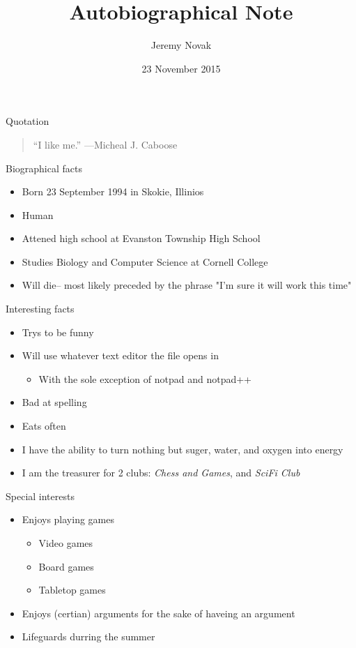 \documentclass{beamer}
\title{Autobiographical Note}
\author{Jeremy Novak}
\institute{Cornell College}
\date{23 November 2015}
\begin{document}
\begin{frame}
  \titlepage
\end{frame}

\begin{frame}{Quotation}
\begin{quotation}
\noindent
``I like me.''
  \flushright
  ---Micheal J. Caboose
  \end{quotation}
\end{frame}

\begin{frame}{Biographical facts}
\begin{itemize}
  \item Born 23 September 1994 in Skokie, Illinios
  \item Human
  \item Attened high school at Evanston Township High School  
  \item Studies Biology and Computer Science at Cornell College
  \item Will die-- most likely preceded by the phrase "I'm sure it will work this time"
  \end{itemize}
\end{frame}

\begin{frame}{Interesting facts}
\begin{itemize}
  \item Trys to be funny
  \item Will use whatever text editor the file opens in 
    \begin{itemize}
    \item With the sole exception of notpad and notpad++
    \end{itemize}
  \item Bad at spelling 
  \item Eats often
  \item I have the ability to turn nothing but suger, water, and  oxygen into energy
  \item I am the treasurer for 2 clubs: \emph{Chess and Games}, and \emph{SciFi Club}  
  \end{itemize}
\end{frame}

\begin{frame}{Special interests}
\begin{itemize}
  \item Enjoys playing games
  \begin{itemize}
    \item Video games
    \item Board games
    \item Tabletop games
    \end{itemize}
  \item Enjoys (certian) arguments for the sake of haveing an argument 
  \item Lifeguards durring the summer
  \end{itemize}
\end{frame}
\end{document}
